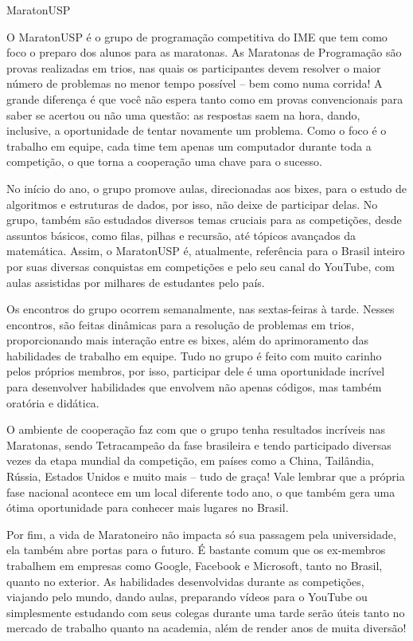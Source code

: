 \begin{subsecao}{MaratonUSP}


O MaratonUSP é o grupo de programação competitiva do IME que tem como foco o
preparo dos alunos para as maratonas. As Maratonas de Programação são provas
realizadas em trios, nas quais os participantes devem resolver o maior número
de problemas no menor tempo possível -- bem como numa corrida! A grande
diferença é que você não espera tanto como em provas convencionais para saber
se acertou ou não uma questão: as respostas saem na hora, dando, inclusive, a
oportunidade de tentar novamente um problema. Como o foco é o trabalho em
equipe, cada time tem apenas um computador durante toda a competição, o que
torna a cooperação uma chave para o sucesso.

No início do ano, o grupo promove aulas, direcionadas aos bixes, 
para o estudo de algoritmos e estruturas de dados, por isso, não deixe de participar delas.
No grupo, também são estudados diversos temas cruciais para as competições,
desde assuntos básicos, como filas, pilhas e recursão, até tópicos avançados
da matemática. Assim, o MaratonUSP é, atualmente, referência para o Brasil
inteiro por suas diversas conquistas em competições e pelo seu canal do
YouTube, com aulas assistidas por milhares de estudantes pelo país.

Os encontros do grupo ocorrem semanalmente, nas sextas-feiras à tarde. Nesses
encontros, são feitas dinâmicas para a resolução de problemas em trios,
proporcionando mais interação entre es bixes, além do aprimoramento das habilidades
de trabalho em equipe. Tudo no grupo é feito com muito carinho pelos próprios
membros, por isso, participar dele é uma oportunidade incrível para desenvolver
habilidades que envolvem não apenas códigos, mas também oratória e didática.

O ambiente de cooperação faz com que o grupo tenha resultados incríveis nas
Maratonas, sendo Tetracampeão da fase brasileira e tendo participado diversas
vezes da etapa mundial da competição, em países como a China, Tailândia,
Rússia, Estados Unidos e muito mais -- tudo de graça! Vale lembrar que a própria
fase nacional acontece em um local diferente todo ano, o que também gera uma ótima
oportunidade para conhecer mais lugares no Brasil.

Por fim, a vida de Maratoneiro não impacta só sua passagem pela universidade,
ela também abre portas para o futuro. É bastante comum que os ex-membros
trabalhem em empresas como Google, Facebook e Microsoft, tanto no Brasil,
quanto no exterior. As habilidades desenvolvidas durante as competições,
viajando pelo mundo, dando aulas, preparando vídeos para o YouTube ou
simplesmente estudando com seus colegas durante uma tarde serão úteis tanto no
mercado de trabalho quanto na academia, além de render anos de muita diversão!


\end{subsecao}
